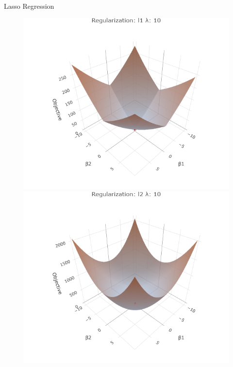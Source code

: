 \documentclass[11pt,compress,t,notes=noshow, xcolor=table]{beamer}
\begin{document}
\begin{vbframe}{Lasso Regression}
\begin{figure}
\begin{minipage}{0.32\linewidth}
        \centerline{\includegraphics[width=\textwidth]{figure/reg_surfaces_l1_lam10.png}}
        \centerline{\includegraphics[width=\textwidth]{figure/reg_surfaces_l2_lam10.png}}
   \end{minipage}
\end{figure}

\framebreak


\end{vbframe}
\end{document}
